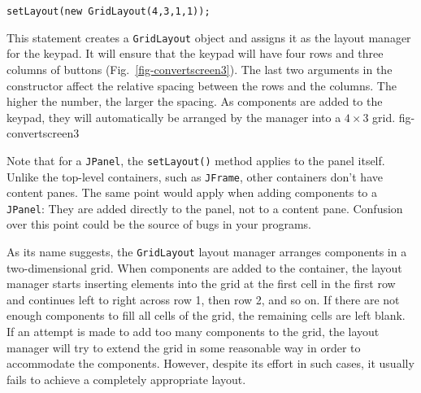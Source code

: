 \begin{jjjlisting}
\begin{lstlisting}
setLayout(new GridLayout(4,3,1,1));
\end{lstlisting}
\end{jjjlisting}

\noindent This statement creates a {\tt GridLayout} object and
assigns it as the layout manager for the keypad. It will ensure that
the keypad will have four rows and three columns of buttons
(Fig.~\ref{fig-convertscreen3}). The last two arguments in the
constructor affect the relative spacing between the rows and the
columns.  The higher the number, the larger the spacing.  As
components are added to the keypad, they will automatically be
arranged by the manager into a $4 \times 3$ grid.
{fig-convertscreen3}


Note that for a {\tt JPanel}, the {\tt setLayout()} method applies to
the panel itself.  Unlike the top-level containers, such as
{\tt JFrame}, other containers don't have content panes.  The same point
would apply when adding components to a {\tt JPanel}: They are
added directly to the panel, not to a content pane.  Confusion
over this point could be the source of bugs in your programs.


\noindent As its name suggests, the {\tt GridLayout} layout manager arranges
components in a two-dimensional grid.  When components are added to the
container, the layout manager starts inserting elements into the grid
at the first cell in the first row and continues left to right across
row 1, then row 2, and so on.  If there are not enough components to
fill all cells of the grid, the remaining cells are left blank.   If an
attempt is made to add too many components to the grid, the layout
manager will try to extend the grid in some reasonable way in order to
accommodate the components.  However, despite its effort in such cases,
it usually fails to achieve a completely appropriate layout.


